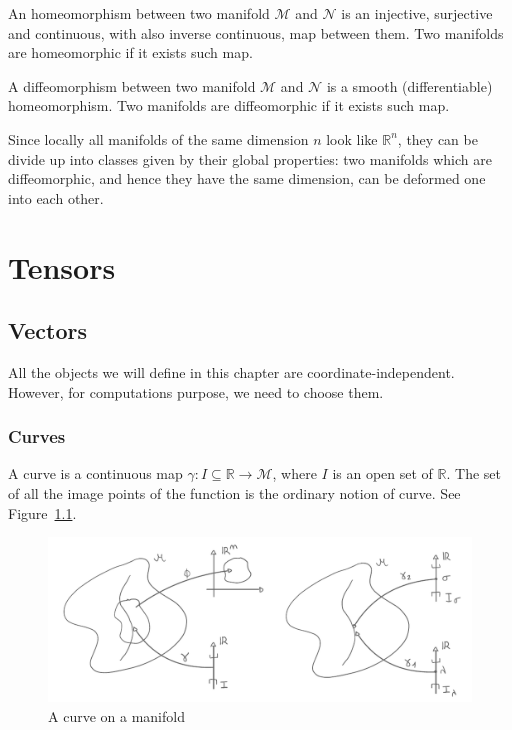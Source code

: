     \begin{definition}[Homeomorphism]
        An homeomorphism between two manifold $\mathcal M$ and $\mathcal N$ is an injective, surjective and continuous, with also inverse continuous, map between them. Two manifolds are homeomorphic if it exists such map.
    \end{definition}
    \begin{definition}[Diffeomorphism]
        A diffeomorphism between two manifold $\mathcal M$ and $\mathcal N$ is a smooth (differentiable) homeomorphism. Two manifolds are diffeomorphic if it exists such map.
    \end{definition}
    \noindent Since locally all manifolds of the same dimension $n$ look like $\mathbb R^n$, they can be divide up into classes given by their global properties: two manifolds which are diffeomorphic, and hence they have the same dimension, can be deformed one into each other. 
 
\chapter{Tensors}

\section{Vectors}

    All the objects we will define in this chapter are coordinate-independent. However, for computations purpose, we need to choose them.

\subsection{Curves}

    \begin{definition}[Curve]
        A curve is a continuous map $\gamma \colon I \subseteq \mathbb R \rightarrow \mathcal M$, where $I$ is an open set of $\mathbb R$. The set of all the image points of the function is the ordinary notion of curve. See Figure~\ref{fig:curve}.
    \end{definition} 

    \begin{figure}[h!]
        \centering
        \includegraphics{curve.pdf}
        \caption{A curve on a manifold}\label{fig:curve}
    \end{figure}

